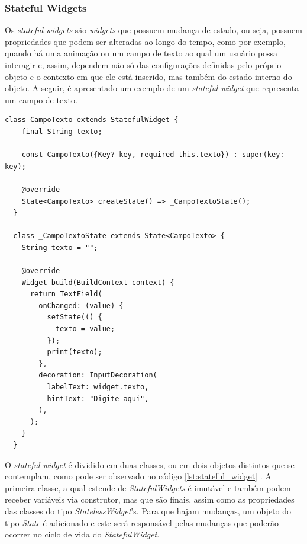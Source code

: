 \subsubsection{Stateful Widgets}
\label{cap2:SubSubSec:StatefulWidgets}
Os \textit{stateful widgets} \cite{flutter2022widgets} \cite{flutter2022stateful} são \textit{widgets} que possuem mudança de estado, ou seja, possuem propriedades que podem ser alteradas ao longo do tempo, como por exemplo, quando há uma animação ou um campo de texto ao qual um usuário possa interagir e, assim, dependem não só das configurações definidas pelo próprio objeto e o contexto em que ele está inserido, mas também do estado interno do objeto. A seguir, é apresentado um exemplo de um \textit{stateful widget} que representa um campo de texto.

\begin{lstlisting}[caption={Exemplo de um \textit{stateful widget} que representa um campo de texto}, label={lst:stateful_widget}]
  class CampoTexto extends StatefulWidget {
    final String texto;

    const CampoTexto({Key? key, required this.texto}) : super(key: key);

    @override
    State<CampoTexto> createState() => _CampoTextoState();
  }

  class _CampoTextoState extends State<CampoTexto> {
    String texto = "";

    @override
    Widget build(BuildContext context) {
      return TextField(
        onChanged: (value) {
          setState(() {
            texto = value;
          });
          print(texto);
        },
        decoration: InputDecoration(
          labelText: widget.texto,
          hintText: "Digite aqui",
        ),
      );
    }
  }
\end{lstlisting}

O \textit{stateful widget} é dividido em duas classes, ou em dois objetos distintos que se contemplam, como pode ser observado no código \ref{lst:stateful_widget} \cite{boelens2018}. A primeira classe, a qual estende de \textit{StatefulWidgets} é imutável e também podem receber variáveis via construtor, mas que são finais, assim como as propriedades das classes do tipo \textit{StatelessWidget}'s. Para que hajam mudanças, um objeto do tipo \textit{State} é adicionado e este será responsável pelas mudanças que poderão ocorrer no ciclo de vida do \textit{StatefulWidget}.

